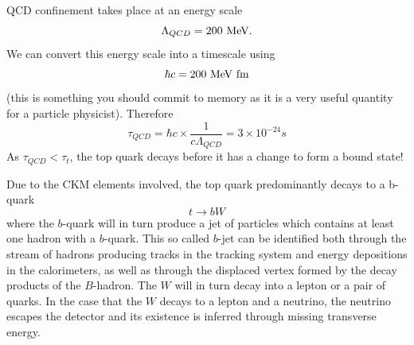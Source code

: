 QCD confinement takes place at an energy scale 
\[
\Lambda_{QCD}=200~{\rm MeV}.
\]
We can convert this energy scale into a timescale using 
\[
\hbar c=200~{\rm MeV~fm}
\]
(this is something you should commit to memory as it is a very useful quantity for a particle physicist).
Therefore
\[
\tau_{QCD}=\hbar c\times\frac{1}{c\Lambda_{QCD}}=3\times 10^{-24}s
\]
As $\tau_{QCD}<\tau_{t}$, the top quark decays before it has a change to form a bound state! 

Due to the CKM elements involved, the top quark predominantly decays to a b-quark 
\[t\rightarrow b W\]
where the $b$-quark will in turn produce a jet of particles which contains at least one hadron with a $b$-quark. This so called $b$-jet can be identified both through the stream of hadrons producing tracks in the tracking system and energy depositions in the calorimeters, as well as through the displaced vertex formed by the decay products of the $B$-hadron.
The $W$ will in turn decay into a lepton or a pair of quarks. In the case that the $W$ decays to a lepton and a neutrino, the neutrino escapes the detector and its existence is inferred through missing transverse energy.
